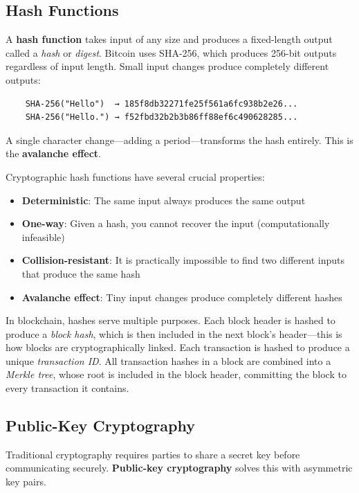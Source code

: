 \documentclass[11pt,a4paper]{article}
\newcommand{\keyword}[1]{\textbf{\textcolor{AccentOrange}{#1}}}
\begin{document}
\subsection{Hash Functions}

A \keyword{hash function} takes input of any size and produces a fixed-length output called a \textit{hash} or \textit{digest}. Bitcoin uses SHA-256, which produces 256-bit outputs regardless of input length. Small input changes produce completely different outputs:

\begin{verbatim}
    SHA-256("Hello")  → 185f8db32271fe25f561a6fc938b2e26...
    SHA-256("Hello.") → f52fbd32b2b3b86ff88ef6c490628285...
\end{verbatim}

A single character change---adding a period---transforms the hash entirely. This is the \keyword{avalanche effect}.

Cryptographic hash functions have several crucial properties:

\begin{itemize}
    \item \textbf{Deterministic}: The same input always produces the same output
    \item \textbf{One-way}: Given a hash, you cannot recover the input (computationally infeasible)
    \item \textbf{Collision-resistant}: It is practically impossible to find two different inputs that produce the same hash
    \item \textbf{Avalanche effect}: Tiny input changes produce completely different hashes
\end{itemize}

In blockchain, hashes serve multiple purposes. Each block header is hashed to produce a \textit{block hash}, which is then included in the next block's header---this is how blocks are cryptographically linked. Each transaction is hashed to produce a unique \textit{transaction ID}. All transaction hashes in a block are combined into a \textit{Merkle tree}, whose root is included in the block header, committing the block to every transaction it contains.

\subsection{Public-Key Cryptography}

Traditional cryptography requires parties to share a secret key before communicating securely. \keyword{Public-key cryptography} solves this with asymmetric key pairs.
\end{document}
